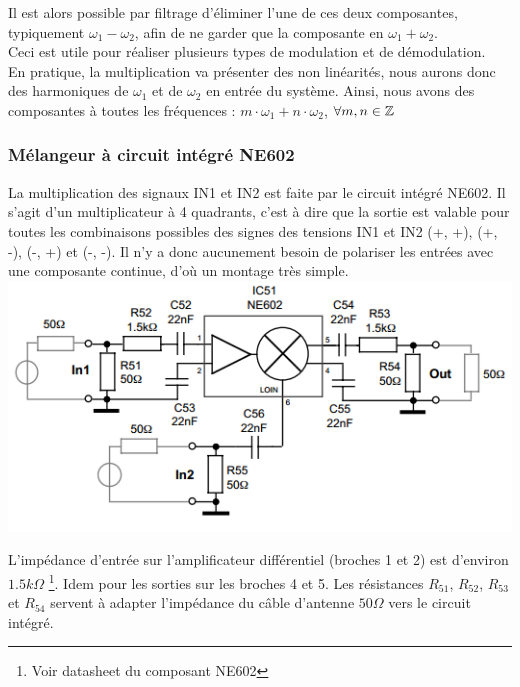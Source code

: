 \documentclass{article}
\begin{document}
Il est alors possible par filtrage d'éliminer l'une de ces deux composantes, typiquement $\omega_{1} - \omega_{2}$, afin de ne garder que la composante en $\omega_{1} + \omega_{2}$.\\

Ceci est utile pour réaliser plusieurs types de modulation et de démodulation.
\\
En pratique, la multiplication va présenter des non linéarités, nous aurons donc des harmoniques de $\omega_{1}$ et de $\omega_{2}$ en entrée du système.
Ainsi, nous avons des composantes à toutes les fréquences : $m \cdot \omega_{1} + n \cdot \omega_{2}$, $\forall m, n \in\mathbb{Z}$


\subsubsection{Mélangeur à circuit intégré NE602}

La multiplication des signaux IN1 et IN2 est faite par le circuit intégré NE602. 
Il s'agit d'un multiplicateur à 4 quadrants, c'est à dire que la sortie est valable pour toutes les combinaisons possibles des signes des tensions IN1 et IN2 (+, +), (+, -), (-, +) et (-, -).
Il n'y a donc aucunement besoin de polariser les entrées avec une composante continue, d'où un montage très simple.\\

\includegraphics{shema_melangeur_gilbert.png}

L'impédance d'entrée sur l'amplificateur différentiel (broches 1 et 2) est d'environ $1.5k\Omega$ \footnote{Voir datasheet du composant NE602}. Idem pour les sorties sur les broches 4 et 5.
Les résistances $R_{51}$, $R_{52}$, $R_{53}$ et $R_{54}$ servent à adapter l'impédance du câble d'antenne $50\Omega$ vers le circuit intégré.\\
\end{document}
